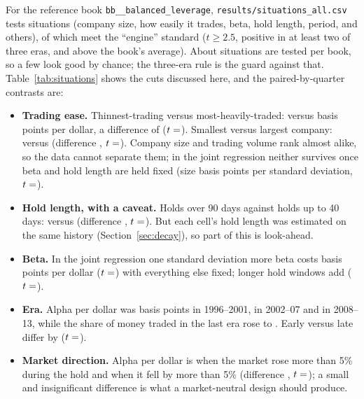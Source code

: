 \documentclass[11pt]{article}
\makeatletter
\theoremstyle{definition}
\newcommand{\1}{\mathbf{1}}
\newcommand{\sn}[1]{\texttt{\sn@scan#1\@nil}}
\def\sn@scan#1{\ifx#1\@nil\else\ifx#1_\_\allowbreak\else#1\fi\expandafter\sn@scan\fi}
\makeatother
\begin{document}
For the reference book \sn{balanced_leverage}, \texttt{results/situations\_all.csv} tests  situations (company size, how easily it trades, beta, hold length, period, and others), of which  meet the ``engine'' standard
($t\ge2.5$, positive in at least two of three eras, and above the book's average). About  situations are tested per book, so a few look good by chance; the three-era rule is the guard against that. Table~\ref{tab:situations} shows the cuts
discussed here, and the paired-by-quarter contrasts are:
\begin{itemize}
  \item \textbf{Trading ease.} Thinnest-trading versus most-heavily-traded:  versus  basis points per dollar, a difference of  ($t=\stv{sit.thin.t}$). Smallest versus largest company:  versus 
        (difference , $t=\stv{sit.small.t}$). Company size and trading volume rank almost alike, so the data cannot separate them; in the joint regression neither survives once beta and hold length are held fixed (size  basis points per standard deviation, $t=\stv{drv.small.t}$).
  \item \textbf{Hold length, with a caveat.} Holds over 90 days against holds up to 40 days:  versus  (difference , $t=\stv{sit.hold.t}$). But each cell's hold length was estimated on the same history (Section~\ref{sec:decay}), so part of this is look-ahead.
  \item \textbf{Beta.} In the joint regression one standard deviation more beta costs  basis points per dollar ($t=\stv{drv.beta.t}$) with everything else fixed; longer hold windows add  ($t=\stv{drv.hold.t}$).
  \item \textbf{Era.} Alpha per dollar was  basis points in 1996--2001,  in 2002--07 and  in 2008--13, while the share of money traded in the last era rose to . Early versus late differ by  ($t=\stv{sit.era.t}$).
  \item \textbf{Market direction.} Alpha per dollar is  when the market rose more than 5\% during the hold and  when it fell by more than 5\% (difference , $t=\stv{sit.mkt.t}$); a small and insignificant difference is what a market-neutral design should produce.
\end{itemize}
\end{document}
